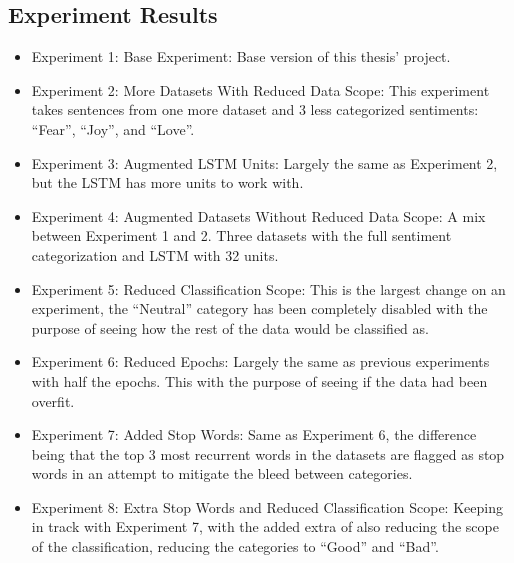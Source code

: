 \documentclass[review]{elsarticle} %
\begin{document}
\subsection{Experiment Results}
\begin{itemize}
\item Experiment 1: Base Experiment: Base version of this thesis' project.
\item Experiment 2: More Datasets With Reduced Data Scope: This experiment takes sentences from one more dataset and 3 less categorized sentiments: ``Fear'', ``Joy'', and ``Love''.
\item Experiment 3: Augmented LSTM Units: Largely the same as Experiment 2, but the LSTM has more units to work with.
\item Experiment 4: Augmented Datasets Without Reduced Data Scope: A mix between Experiment 1 and 2. Three datasets with the full sentiment categorization and LSTM with 32 units.
\item Experiment 5: Reduced Classification Scope: This is the largest change on an experiment, the ``Neutral'' category has been completely disabled with the purpose of seeing how the rest of the data would be classified as.
\item Experiment 6: Reduced Epochs: Largely the same as previous experiments with half the epochs. This with the purpose of seeing if the data had been overfit.
\item Experiment 7: Added Stop Words: Same as Experiment 6, the difference being that the top 3 most recurrent words in the datasets are flagged as stop words in an attempt to mitigate the bleed between categories.
\item Experiment 8: Extra Stop Words and Reduced Classification Scope: Keeping in track with Experiment 7, with the added extra of also reducing the scope of the classification, reducing the categories to ``Good'' and ``Bad''.
\end{itemize}
\end{document}
